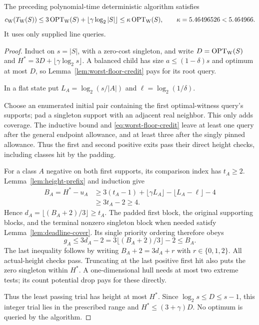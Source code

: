 \begin{theorem}
\label{thm:worst}
The preceding polynomial-time deterministic algorithm satisfies
\[
 c_{\mathrm W}(T_{\mathrm W}(S))\le
 3\operatorname{OPT}_{\mathrm W}(S)+\left\lfloor\gamma\log_2|S|\right\rfloor
 \le\kappa\operatorname{OPT}_{\mathrm W}(S),\qquad \kappa=5.46496526<5.464966.
\]
It uses only supplied line queries.
\end{theorem}
\begin{proof}
Induct on $s=|S|$, with a zero-cost singleton, and write
$D=\operatorname{OPT}_{\mathrm W}(S)$ and $H^*=3D+\lfloor\gamma\log_2s\rfloor$.
A balanced child has size $a\le(1-\delta)s$ and optimum at most $D$,
so Lemma~\ref{lem:worst-floor-credit} pays for its root query.

In a flat state put $L_A=\log_2(s/|A|)$ and
$\ell=\log_2(1/\delta)$.

Choose an enumerated initial pair containing the first optimal-witness
query's supports; pad a singleton support with an adjacent real
neighbor. This only adds coverage. The inductive bound and
\eqref{eq:worst-floor-credit} leave at least one query after the
general endpoint allowance, and at least three after the singly pinned
allowance. Thus the first and second positive exits pass their direct
height checks, including classes hit by the padding.

For a class $A$ negative on both first supports, its comparison index
has $t_A\ge2$. Lemma~\ref{lem:height-prefix} and induction give
\[
\begin{aligned}
 B_A=H^*-u_A
 &\ge3(t_A-1)+\lfloor\gamma L_A\rfloor
                    -\lfloor L_A-\ell\rfloor-4\\
 &\ge3t_A-2\ge4.
\end{aligned}
\]
Hence $d_A=\lfloor(B_A+2)/3\rfloor\ge t_A$. The padded first block,
the original supporting blocks, and the terminal nonzero singleton
block when needed satisfy Lemma~\ref{lem:deadline-cover}. Its single
priority ordering therefore obeys
\[
 g_A\le3d_A-2
 =3\lfloor(B_A+2)/3\rfloor-2\le B_A.
\]
The last inequality follows by writing $B_A+2=3d_A+r$ with
$r\in\{0,1,2\}$. All actual-height checks pass. Truncating at the
last positive first hit also puts the zero singleton within $H^*$.
A one-dimensional hull needs at most two extreme tests; its count
potential drop pays for these directly.

Thus the least passing trial has height at most $H^*$. Since
$\log_2s\le D\le s-1$, this integer trial lies in the prescribed
range and $H^*\le(3+\gamma)D$. No optimum is queried by the algorithm.
\end{proof}

